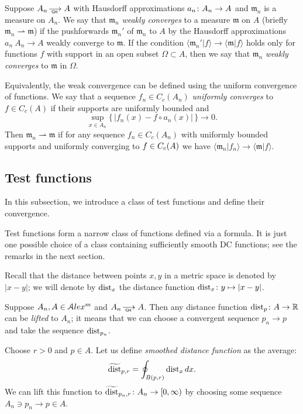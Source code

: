 Suppose $A_n\GHto A$ with Hausdorff approximations $a_n\:A_n\zz\to A$ and
$\mathfrak m_n$ is a measure on $A_n$.
We say that $\mathfrak m_n$ \emph{weakly converges} to a measure $\mathfrak m$ on $A$ (briefly $\mathfrak m_n\rightharpoonup \mathfrak m$) if the pushforwards $\mathfrak m_n'$ of $\mathfrak m_n$ to $A$  by the Hausdorff approximations $a_n\:A_n\to A$ weakly converge to 
$\mathfrak m$.
If the condition $\langle \mathfrak m_n'|f\rangle \to \langle \mathfrak m|f\rangle $ holds only for functions $f$ with support in an open subset $\Omega\subset A$, then we say that $\mathfrak m_n$ \emph{weakly converges} to $\mathfrak m$ in $\Omega$.

Equivalently, the weak convergence can be defined using the uniform convergence of functions.
We say that  a sequence $f_n\in C_c(A_n)$
\emph{uniformly converges} to $f\in C_c(A)$
if their supports are uniformly bounded and
\[\sup_{x\in A_n}\{\,|f_n(x)-f\circ a_n(x)|\,\}\to 0.\]
Then  $\mathfrak m_n\rightharpoonup \mathfrak m$
if for any sequence $f_n\in C_c(A_n)$
with uniformly bounded supports and
uniformly converging to $f\zz\in C_c(A)$
we have $\langle \mathfrak m_n|f_n\rangle \to \langle \mathfrak m|f\rangle $.

\subsection{Test functions}\label{sec:test-functions}

In this subsection, we introduce a class of test functions and define their convergence.

Test functions form a narrow class of functions defined via a formula.
It is just one possible choice of a class containing sufficiently smooth DC functions; see the remarks in the next section.

Recall that the distance between points $x,y$ in a metric space is denoted by $|x-y|$;
we will denote by $\operatorname{\rm dist}_x$ the distance function $\operatorname{\rm dist}_x\colon y\mapsto |x-y|$.

{\sloppy 

Suppose $A_n, A\in \mathcal{A}lex^m$ and  $A_n\GHto A$.
Then any distance function $\dist_p\:A\zz\to\RR$ can be \emph{lifted} to $A_n$;
it means that we can choose a convergent sequence $p_n\to p$ and take the
sequence $\operatorname{\rm dist}_{p_n}$.

}

Choose $r>0$ and $p\in A$.
Let us define \emph{smoothed distance function} as the average:
$$\widetilde{\operatorname{\rm dist}}_{p,r} =\oint_{B(p,r)} \operatorname{\rm dist}_{x}dx.$$ 
We can lift this function to
$\widetilde{\operatorname{\rm dist}}_{p_n,r}\colon A_n\to [0,\infty)$
by choosing some  sequence $A_n\ni p_n\to p\in A$.

